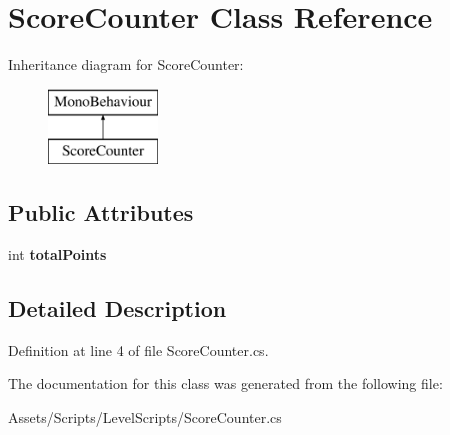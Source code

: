 \hypertarget{class_score_counter}{\section{Score\+Counter Class Reference}
\label{class_score_counter}
}
Inheritance diagram for Score\+Counter\+:\begin{figure}[H]
\begin{center}
\leavevmode
\includegraphics[height=2.000000cm]{class_score_counter}
\end{center}
\end{figure}
\subsection*{Public Attributes}
\begin{DoxyCompactItemize}
\item 
\hypertarget{class_score_counter_a4dfb92a30d6b9f84514a10ebcf138692}{int {\bfseries total\+Points}}\label{class_score_counter_a4dfb92a30d6b9f84514a10ebcf138692}

\end{DoxyCompactItemize}


\subsection{Detailed Description}


Definition at line 4 of file Score\+Counter.\+cs.



The documentation for this class was generated from the following file\+:\begin{DoxyCompactItemize}
\item 
Assets/\+Scripts/\+Level\+Scripts/Score\+Counter.\+cs\end{DoxyCompactItemize}
